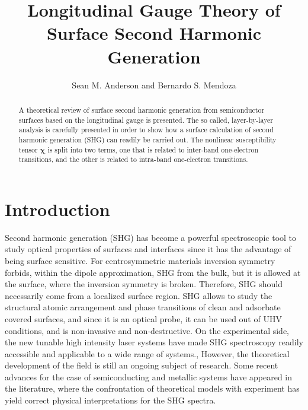 \documentclass[floatfix,prb,aps,superscriptaddress,11pt,preprint,letterpaper]{revtex4}
\begin{document}
\title{Longitudinal Gauge Theory of Surface Second Harmonic Generation}
\author{Sean M. Anderson and Bernardo S. Mendoza}

 \begin{abstract}
 A theoretical review of surface second harmonic generation from
 semiconductor surfaces based on the longitudinal gauge is
 presented. The so called, layer-by-layer analysis is carefully
 presented in order to show how a surface calculation of second
 harmonic generation (SHG) can readily be carried out. The nonlinear
 susceptibility tensor $\boldsymbol{\chi}$ is split into two terms,
 one that is related to inter-band one-electron transitions, and the
 other is related to intra-band one-electron transitions. 

% 
\end{abstract}  

\maketitle
\tableofcontents

\section{Introduction}\label{intro}

Second harmonic generation (SHG) has become a powerful spectroscopic
tool to study optical properties of surfaces and interfaces since it
has the advantage of being surface sensitive. For centrosymmetric
materials inversion symmetry forbids, within the dipole approximation,
SHG from the bulk, but it is allowed at the surface, where the
inversion symmetry is broken. Therefore, SHG should necessarily come
from a localized surface region. SHG allows to study the structural
atomic arrangement and phase transitions of clean and adsorbate
covered surfaces, and since it is an optical probe, it can be used out
of UHV conditions, and is non-invasive and non-destructive. On the
experimental side, the new tunable high intensity laser systems have
made SHG spectroscopy readily accessible and applicable to a wide
range of
systems.\cite{downer_optical_2001},\cite{lupke_characterization_1999}
However, the theoretical development of the field is still an ongoing
subject of research. Some recent advances for the case of
semiconducting and metallic systems have appeared in the literature,
where the confrontation of theoretical 
models with experiment has yield correct physical interpretations for
the SHG
spectra.\cite{downer_optical_2001,mendoza_ab_2001,lim_optical_2000,gavrilenko_optical_2000,mendoza_visible-infrared_1999,mendoza_microscopic_1998,mendoza_local-field_1996,mendoza_polarizable-bond_1997,guyot-sionnest_electronic_1990} 
\end{document}
